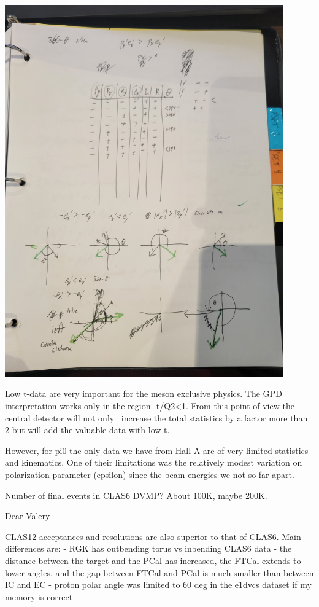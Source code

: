 \includegraphics[width=0.9\textwidth]{Chapters/Ch1-Intro/Ch1-Sec2-GPDs-DVMP/pics/phi_math_1.jpg}       
            


Low t-data are very important for the meson exclusive physics. The GPD interpretation works only in the region -t/Q2<1. From this point of view the central detector will not only  increase the total statistics by a factor more than 2 but will add the valuable data with low t.


 However, for pi0 the only data we have from Hall A are of very limited statistics and kinematics. One of their limitations was the relatively modest variation on polarization parameter (epsilon) since the beam energies we not so far apart. 
 
 Number of final events in CLAS6 DVMP? About 100K, maybe 200K. 
 
 
 
 Dear Valery

CLAS12 acceptances and resolutions are also superior to that of CLAS6. Main differences are:
- RGK has outbending torus vs inbending CLAS6 data
- the distance between the target and the PCal has increased, the FTCal extends to lower angles, and the gap between FTCal and PCal is much smaller than between IC and EC
- proton polar angle was limited to 60 deg in the e1dvcs dataset if my memory is correct

